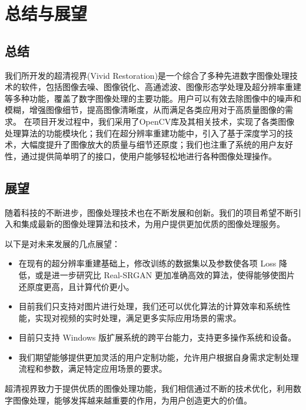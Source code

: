 \documentclass[UTF8,openany]{ctexbook}
\begin{document}
\newpage

\chapter{总结与展望}

\section{总结}

我们所开发的超清视界(Vivid Restoration)是一个综合了多种先进数字图像处理技术的软件，包括图像去噪、图像锐化、高通滤波、图像形态学处理及超分辨率重建等多种功能，覆盖了数字图像处理的主要功能。用户可以有效去除图像中的噪声和模糊，增强图像细节，提高图像清晰度，从而满足各类应用对于高质量图像的需求。
在项目开发过程中，我们采用了OpenCV库及其相关技术，实现了各类图像处理算法的功能模块化；我们在超分辨率重建功能中，引入了基于深度学习的技术，大幅度提升了图像放大的质量与细节还原度；我们也注重了系统的用户友好性，通过提供简单明了的接口，使用户能够轻松地进行各种图像处理操作。

\section{展望}

随着科技的不断进步，图像处理技术也在不断发展和创新。我们的项目希望不断引入和集成最新的图像处理算法和技术，为用户提供更加优质的图像处理服务。

以下是对未来发展的几点展望：

\begin{itemize}[label=--]
  \item 在现有的超分辨率重建基础上，修改训练的数据集以及参数使各项 Loss 降低，或是进一步研究比 Real-SRGAN 更加准确高效的算法，使得能够使图片还原度更高，且计算代价更小。
  
  \item 目前我们只支持对图片进行处理，我们还可以优化算法的计算效率和系统性能，实现对视频的实时处理，满足更多实际应用场景的需求。
  
  \item 目前只支持 Windows 版扩展系统的跨平台能力，支持更多操作系统和设备。
  
  \item 我们期望能够提供更加灵活的用户定制功能，允许用户根据自身需求定制处理流程和参数，满足特定应用场景的要求。
\end{itemize}

  超清视界致力于提供优质的图像处理功能，我们相信通过不断的技术优化，利用数字图像处理，能够发挥越来越重要的作用，为用户创造更大的价值。
\end{document}
